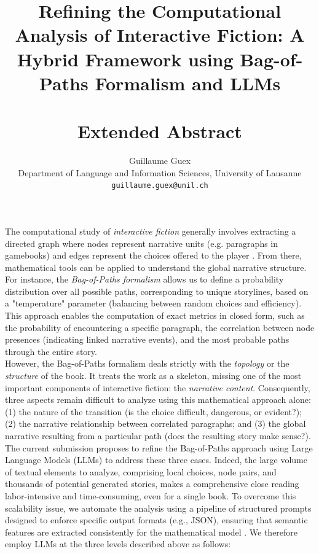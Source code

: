 \documentclass[11pt]{article}
\title{Refining the Computational Analysis of Interactive Fiction: A Hybrid Framework using Bag-of-Paths Formalism and LLMs \\ \vspace{0.3cm} \\
Extended Abstract}
\author{Guillaume Guex \\
  Department of Language and Information Sciences, University of Lausanne \\
  \texttt{guillaume.guex@unil.ch}}
\begin{document}
\maketitle

The computational study of \emph{interactive fiction} \citep{aarseth_cybertext_1997, montfort_twisty_2005} generally involves extracting a directed graph where nodes represent narrative units (e.g. paragraphs in gamebooks) and edges represent the choices offered to the player \citep{riedl_interactive_2013, metrailler_etude_2025}. From there, mathematical tools can be applied to understand the global narrative structure. For instance, the \emph{Bag-of-Paths formalism} \citep{francoisse_bag--paths_2017, guex_covariance_2021} allows us to define a probability distribution over all possible paths, corresponding to unique storylines, based on a "temperature" parameter (balancing between random choices and efficiency). This approach enables the computation of exact metrics in closed form, such as the probability of encountering a specific paragraph, the correlation between node presences (indicating linked narrative events), and the most probable paths through the entire story.\\

However, the Bag-of-Paths formalism deals strictly with the \emph{topology} or the \emph{structure} of the book. It treats the work as a skeleton, missing one of the most important components of interactive fiction: the \emph{narrative content}. Consequently, three aspects remain difficult to analyze using this mathematical approach alone: (1) the nature of the transition (is the choice difficult, dangerous, or evident?); (2) the narrative relationship between correlated paragraphs; and (3) the global narrative resulting from a particular path (does the resulting story make sense?). \\

The current submission proposes to refine the Bag-of-Paths approach using Large Language Models (LLMs) to address these three cases. Indeed, the large volume of textual elements to analyze, comprising local choices, node pairs, and thousands of potential generated stories, makes a comprehensive close reading labor-intensive and time-consuming, even for a single book. To overcome this scalability issue, we automate the analysis using a pipeline of structured prompts designed to enforce specific output formats (e.g., JSON), ensuring that semantic features are extracted consistently for the mathematical model \cite{wang_slot_2025}. We therefore employ LLMs at the three levels described above as follows:
\end{document}

